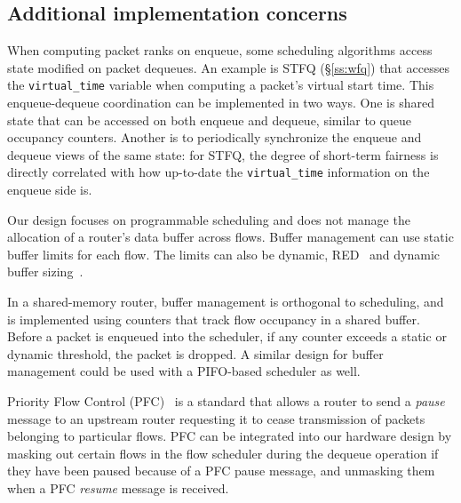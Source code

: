 \subsection{Additional implementation concerns}
\label{ss:add_impl}

When computing packet ranks on enqueue, some scheduling algorithms access
state modified on packet dequeues. An example is STFQ (\S\ref{ss:wfq}) that
accesses the \texttt{virtual\_time} variable when computing a packet's virtual
start time. This enqueue-dequeue coordination can be implemented in two ways.
One is shared state that can be accessed on both enqueue and dequeue, similar
to queue occupancy counters. Another is to periodically synchronize the enqueue
and dequeue views of the same state: for STFQ, the degree of short-term
fairness is directly correlated with how up-to-date the \texttt{virtual\_time}
information on the enqueue side is.

Our design focuses on programmable scheduling and does not manage the
allocation of a router's data buffer across flows.  Buffer management can use
static buffer limits for each flow. The limits can also be dynamic, \eg
RED~\cite{red} and dynamic buffer sizing~\cite{broadcom_dynamic}.

In a shared-memory router, buffer management is orthogonal to scheduling,
and is implemented using counters that track flow occupancy in a shared
buffer. Before a packet is enqueued into the scheduler, if any counter
 exceeds a static or dynamic threshold, the packet is dropped. A similar
design for buffer management could be used with a PIFO-based scheduler as well.

Priority Flow Control (PFC)~\cite{pfc} is a standard that allows a router to
send a {\em pause} message to an upstream router requesting it to cease
transmission of packets belonging to particular flows. PFC can be integrated
into our hardware design by masking out certain flows in the flow scheduler
during the dequeue operation if they have been paused because of a PFC pause
message, and unmasking them when a PFC {\em resume} message is received.
